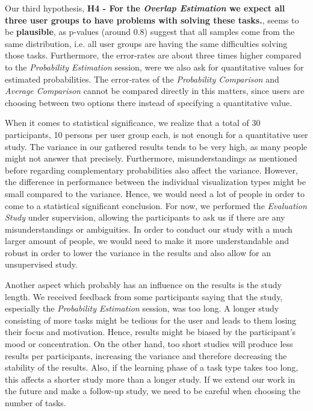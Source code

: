 Our third hypothesis, \textbf{H4 - For the \textit{Overlap Estimation} we expect all three user groups to have problems with solving these tasks.}, seems to be \textbf{plausible}, as p-values (around 0.8) suggest that all samples come from the same distribution, i.e. all user groups are having the same difficulties solving those tasks. Furthermore, the error-rates are about three times higher compared to the \textit{Probability Estimation} session, were we also ask for quantitative values for estimated probabilities. The error-rates of the \textit{Probability Comparison} and \textit{Average Comparison} cannot be compared directly in this matters, since users are choosing between two options there instead of specifying a quantitative value. \par \medskip

When it comes to statistical significance, we realize that a total of 30 participants, 10 persons per user group each, is not enough for a quantitative user study. The variance in our gathered results tends to be very high, as many people might not answer that precisely. Furthermore, misunderstandings as mentioned before regarding complementary probabilities also affect the variance. However, the difference in performance between the individual visualization types might be small compared to the variance. Hence, we would need a lot of people in order to come to a statistical significant conclusion. For now, we performed the \textit{Evaluation Study} under supervision, allowing the participants to ask us if there are any misunderstandings or ambiguities. In order to conduct our study with a much larger amount of people, we would need to make it more understandable and robust in order to lower the variance in the results and also allow for an unsupervised study. \par \medskip

Another aspect which probably has an influence on the results is the study length. We received feedback from some participants saying that the study, especially the \textit{Probability Estimation} session, was too long. A longer study consisting of more tasks might be tedious for the user and leads to them losing their focus and motivation. Hence, results might be biased by the participant’s mood or concentration. On the other hand, too short studies will produce less results per participants, increasing the variance and therefore decreasing the stability of the results. Also, if the learning phase of a task type takes too long, this affects a shorter study more than a longer study. If we extend our work in the future and make a follow-up study, we need to be careful when choosing the number of tasks.